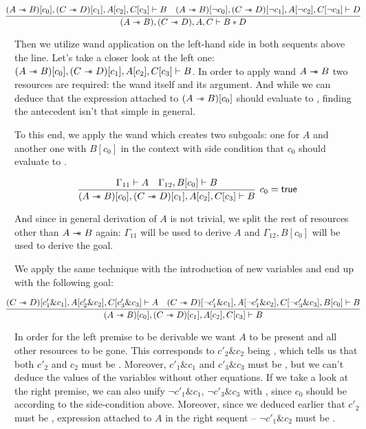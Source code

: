 \[\hspace{-0.03\linewidth}
\infer{(A \wand B), (C \wand D), A, C \vdash B \ast D}
      {(A \wand B)[c_0], (C \wand D)[c_1], A[c_2], C[c_3] \vdash B  &
       (A \wand B)[\neg c_0], (C \wand D)[\neg c_1] , A[\neg c_2] , C[\neg c_3] \vdash D}
\]

Then we utilize wand application on the left-hand side in both sequents above the line.
Let's take a closer look at the left one: \((A \mathrel{-\mkern-6mu*} B)[c_0], (C \mathrel{-\mkern-6mu*} D)[c_1], A[c_2], C[c_3] \vdash B\).
In order to apply wand \(A \mathrel{-\mkern-6mu*} B\) two resources are required: the wand itself and its argument.
And while we can deduce that the expression attached to \((A \mathrel{-\mkern-6mu*} B)[c_0]\) should evaluate to \true, finding the antecedent isn't that simple in general.

To this end, we apply the wand which creates two subgoals: one for \(A\) and another one with \(B[c_0]\) in the context with side condition that \(c_0\) should evaluate to \true.

\[
\infer[c_0 = \true]
      {(A \wand B)[c_0], (C \wand D)[c_1],
        A[c_2], C[c_3] \vdash B}
      { \Gamma_{11} \vdash A &
        \Gamma_{12}, B[c_0] \vdash B}
\]

And since in general derivation of \(A\) is not trivial, we split the rest of resources other than \(A \mathrel{-\mkern-6mu*} B\) again: \(\Gamma_{11}\) will be used to derive \(A\) and \(\Gamma_{12}, B[c_0]\) will be used to derive the goal.

We apply the same technique with the introduction of new variables and end up with the following goal:

\[
\hspace{-0.03\linewidth}
\infer{(A \wand B)[c_0], (C \wand D)[c_1], A[c_2], C[c_3] \vdash B}
      {(C \wand D)[c'_1 \& c_1], A[c'_2 \& c_2], C[c'_3 \& c_3] \vdash A &
       (C \wand D)[\neg c'_1 \& c_1], A[\neg c'_1 \& c_2], C[\neg c'_3 \& c_3], B[c_0] \vdash B}
\]

In order for the left premise to be derivable we want \(A\) to be present and all other resources to be gone.
This corresponds to \(c'_2 \& c_2\) being \true, which tells us that both \(c'_2\) and \(c_2\) must be \true.
Moreover, \(c'_1 \& c_1\) and \(c'_3 \& c_3\) must be \false, but we can't deduce the values of the variables without other equations.
If we take a look at the right premise, we can also unify \(\neg c'_1 \& c_1\), \(\neg c'_3 \& c_3\) with \false, since \(c_0\) should be \true according to the side-condition above.
Moreover, since we deduced earlier that \(c'_2\) must be \true, expression attached to \(A\) in the right sequent -- \(\neg c'_1 \& c_2\) must be \false.

